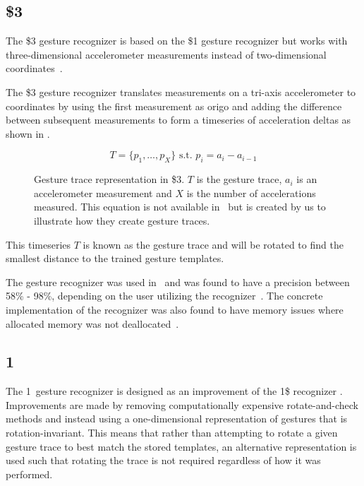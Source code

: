
\subsection{\$3}

The \$3 gesture recognizer is based on the \$1 gesture recognizer but works with three-dimensional accelerometer measurements instead of two-dimensional coordinates~\cite{threedollar}.

The \$3 gesture recognizer translates measurements on a tri-axis accelerometer to coordinates by using the first measurement as origo and adding the difference between subsequent measurements to form a timeseries of acceleration deltas as shown in .

\begin{figure}[h]
\[ T = \{p_1,\ldots,p_X\} \text{ s.t. } p_i=a_i-a_{i-1} \]
\caption{Gesture trace representation in \$3. $T$ is the gesture trace, $a_i$ is an accelerometer measurement and $X$ is the number of accelerations measured.
This equation is not available in~\cite{threedollar} but is created by us to illustrate how they create gesture traces.}
\label{eq:acceleration-timeseries}
\end{figure}

This timeseries $T$ is known as the gesture trace and will be rotated to find the smallest distance to the trained gesture templates.

The gesture recognizer was used in~\cite{prespecialisation} and was found to have a precision between 58\% - 98\%, depending on the user utilizing the recognizer~\cite[p. 344]{threedollar}. The concrete implementation of the recognizer was also found to have memory issues where allocated memory was not deallocated~\cite[p. 54]{prespecialisation}.

\subsection{1\textcent}

The 1\textcent~gesture recognizer is designed as an improvement of the 1\$ recognizer \cite{wobbrock2007gestures}. Improvements are made by removing computationally expensive rotate-and-check methods and instead using a one-dimensional representation of gestures that is rotation-invariant.
This means that rather than attempting to rotate a given gesture trace to best match the stored templates, an alternative representation is used such that rotating the trace is not required regardless of how it was performed.

